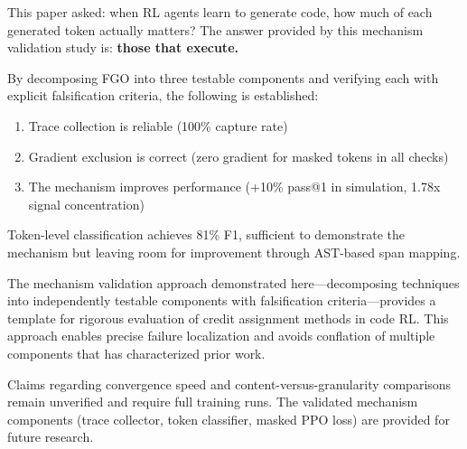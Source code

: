 
This paper asked: when RL agents learn to generate code, how much of each generated token actually matters? The answer provided by this mechanism validation study is: \textbf{those that execute.}

By decomposing FGO into three testable components and verifying each with explicit falsification criteria, the following is established:

\begin{enumerate}
\item Trace collection is reliable (100\% capture rate)
\item Gradient exclusion is correct (zero gradient for masked tokens in all checks)
\item The mechanism improves performance (+10\% pass@1 in simulation, 1.78x signal concentration)
\end{enumerate}

Token-level classification achieves 81\% F1, sufficient to demonstrate the mechanism but leaving room for improvement through AST-based span mapping.

The mechanism validation approach demonstrated here---decomposing techniques into independently testable components with falsification criteria---provides a template for rigorous evaluation of credit assignment methods in code RL. This approach enables precise failure localization and avoids conflation of multiple components that has characterized prior work.

Claims regarding convergence speed and content-versus-granularity comparisons remain unverified and require full training runs. The validated mechanism components (trace collector, token classifier, masked PPO loss) are provided for future research.
